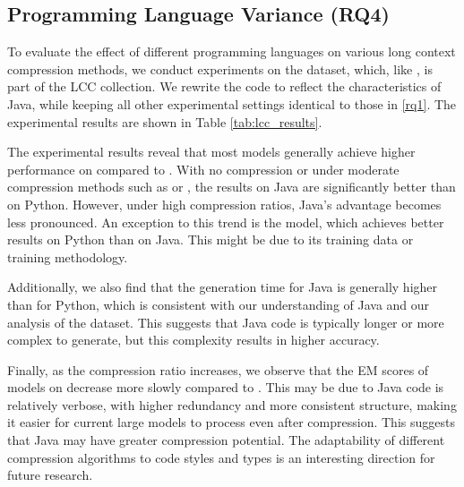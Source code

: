\subsection{Programming Language Variance (RQ4)}

To evaluate the effect of different programming languages on various long context compression methods, we conduct experiments on the \lccjava dataset, which, like \lccpython, is part of the LCC collection. We rewrite the code to reflect the characteristics of Java, while keeping all other experimental settings identical to those in \ref{rq1}. The experimental results are shown in Table \ref{tab:lcc_results}.

The experimental results reveal that most models generally achieve higher performance on \lccjava compared to \lccpython.
With no compression or under moderate compression methods such as \rag or \ragfunction, the results on Java are significantly better than on Python. However, under high compression ratios, Java’s advantage becomes less pronounced. An exception to this trend is the \qwenseven model, which achieves better results on Python than on Java. This might be due to its training data or training methodology.

Additionally, we also find that the generation time for Java is generally higher than for Python, which is consistent with our understanding of Java and our analysis of the dataset. This suggests that Java code is typically longer or more complex to generate, but this complexity results in higher accuracy.

Finally, as the compression ratio increases, we observe that the EM scores of models on \lccjava decrease more slowly compared to \lccpython. This may be due to Java code is relatively verbose, with higher redundancy and more consistent structure, making it easier for current large models to process even after compression. This suggests that Java may have greater compression potential. The adaptability of different compression algorithms to code styles and types is an interesting direction for future research.

